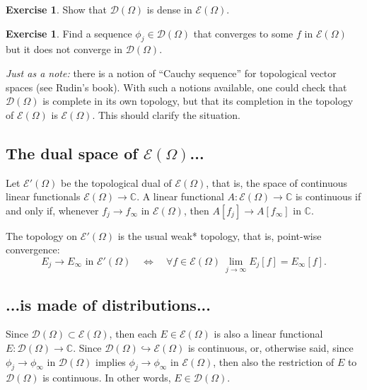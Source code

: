\documentclass[a4paper,9pt]{amsart}
\newcommand{\scr}[1]{\mathscr{#1}}
\newcommand{\C}{\mathbb{C}}	%
\newcommand{\into}{\hookrightarrow}		%
\newcommand{\IFF}{\Leftrightarrow}	%
\newcommand{\TODO}{{\bf\color{Red}TODO}}
\theoremstyle{plain}
\theoremstyle{definition}
\newtheorem{exercise}[proposition]{Exercise}%
\theoremstyle{remark}
\begin{document}
\begin{exercise}
	Show that $\scr D(\Omega)$ is dense in $\scr E(\Omega)$.
\end{exercise}

\begin{exercise}
	Find a sequence $\phi_j\in\scr D(\Omega)$ that converges to some $f$ in $\scr E(\Omega)$ but it does not converge in $\scr D(\Omega)$.
	
	{\it Just as a note:} there is a notion of ``Cauchy sequence'' for topological vector spaces (see Rudin's book).
	With such a notions available, one could check that $\scr D(\Omega)$ is complete in its own topology, but that its completion in the topology of $\scr E(\Omega)$ is $\scr E(\Omega)$. 
	This should clarify the situation.
\end{exercise}

\subsection{The dual space of $\scr E(\Omega)$...}\label{subs67e2723b}
Let $\scr E'(\Omega)$ be the topological dual of $\scr E(\Omega)$, that is, the space of continuous linear functionals $\scr E(\Omega)\to\C$.
A linear functional $A:\scr E(\Omega)\to\C$ is continuous if and only if, whenever $f_j\to f_\infty$ in $\scr E(\Omega)$, then $A[f_j] \to A[f_\infty]$ in $\C$.

The topology on $\scr E'(\Omega)$ is the usual weak* topology,
that is, point-wise convergence:
\begin{equation}
	E_j\to E_\infty \text{ in }\scr E'(\Omega)
	\quad\IFF\quad
	\forall f\in\scr E(\Omega)\ \lim_{j\to\infty} E_j[f] = E_\infty[f] .
\end{equation}

\subsection{...is made of distributions...}\label{subs67eb9b4b}

Since $\scr D(\Omega)\subset\scr E(\Omega)$, then each $E\in\scr E(\Omega)$ is also a linear functional $E:\scr D(\Omega)\to\C$.
Since $\scr D(\Omega)\into \scr E(\Omega)$ is continuous, or, otherwise said, since $\phi_j\to\phi_\infty$ in $\scr D(\Omega)$ implies $\phi_j\to\phi_\infty$ in $\scr E(\Omega)$, then also the restriction of $E$ to $\scr D(\Omega)$ is continuous.
In other words, $E\in\scr D(\Omega)$.
\end{document}
